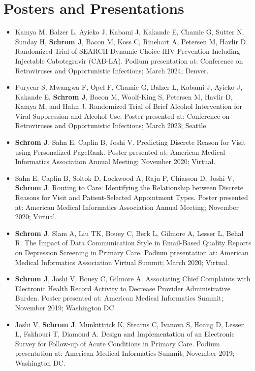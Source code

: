 \documentclass[11pt]{article}
\begin{document}
\section{Posters and Presentations}
\begin{itemize}
    \setlength{\itemsep}{1em}
    \renewcommand{\labelitemi}{}
    \setlength{\leftskip}{-1.5em}
    \item Kamya M, Balzer L, Ayieko J, Kabami J, Kakande E, Chamie G, Sutter N, Sunday H, \textbf{Schrom J}, Bacon M, Koss C, Rinehart A, Petersen M, Havlir D. Randomized Trial of SEARCH Dynamic Choice HIV Prevention Including Injectable Cabotegravir (CAB-LA). Podium presentation at: Conference on Retroviruses and Opportunistic Infections; March 2024; Denver. 
    \item Puryear S, Mwangwa F, Opel F, Chamie G, Balzer L, Kabami J, Ayieko J, Kakande E, \textbf{Schrom J}, Bacon M, Woolf-King S, Petersen M, Havlir D, Kamya M, and Hahn J. Randomized Trial of Brief Alcohol Intervention for Viral Suppression and Alcohol Use. Poster presented at: Conference on Retroviruses and Opportunistic Infections; March 2023; Seattle. 
    \item \textbf{Schrom J}, Sahn E, Caplin B, Joshi V. Predicting Discrete Reason for Visit using Personalized PageRank. Poster presented at: American Medical Informatics Association Annual Meeting; November 2020; Virtual.
    \item Sahn E, Caplin B, Soltok D, Lockwood A, Raju P, Chiasson D, Joshi V, \textbf{Schrom J}. Routing to Care: Identifying the Relationship between Discrete Reasons for Visit and Patient-Selected Appointment Types. Poster presented at: American Medical Informatics Association Annual Meeting; November 2020; Virtual.
    \item \textbf{Schrom J}, Slam A, Liu TK, Bouey C, Berk L, Gilmore A, Lesser L, Behal R. The Impact of Data Communication Style in Email-Based Quality Reports on Depression Screening in Primary Care. Podium presentation at: American Medical Informatics Association Virtual Summit; March 2020; Virtual. 
    \item \textbf{Schrom J}, Joshi V, Bouey C, Gilmore A. Associating Chief Complaints with Electronic Health Record Activity to Decrease Provider Administrative Burden. Poster presented at: American Medical Informatics Summit; November 2019; Washington DC. 
    \item Joshi V, \textbf{Schrom J}, Munkittrick K, Stearns C, Ivanova S, Hoang D, Lesser L, Fakhouri T, Diamond A. Design and Implementation of an Electronic Survey for Follow-up of Acute Conditions in Primary Care. Podium presentation at: American Medical Informatics Summit; November 2019; Washington DC. 

\end{itemize}
\end{document}
